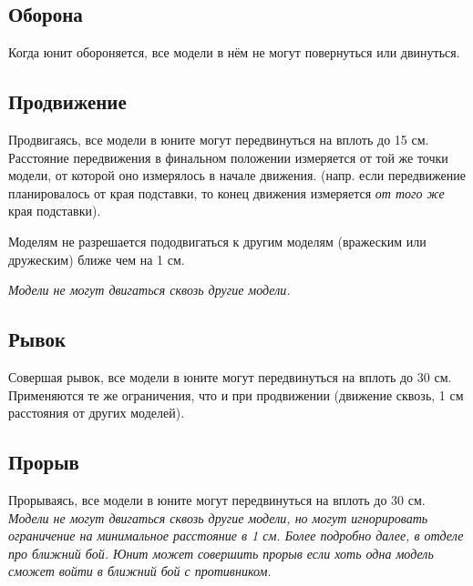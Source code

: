 \documentclass[twocolumn]{article}
\begin{document}
\subsection{Оборона}
Когда юнит обороняется, все модели в нём не могут повернуться или двинуться.

\subsection{Продвижение}
Продвигаясь, все модели в юните могут передвинуться на вплоть до 15 см. Расстояние передвижения в финальном положении измеряется от той же точки модели, от которой оно измерялось в начале движения. (напр. если передвижение планировалось от края подставки, то конец движения измеряется \emph{от того же} края подставки).

Моделям не разрешается пододвигаться к другим моделям (вражеским или дружеским) ближе чем на 1 см.

\emph{Модели не могут двигаться сквозь другие модели.}

\subsection{Рывок}
Совершая рывок, все модели в юните могут передвинуться на вплоть до 30 см. Применяются те же ограничения, что и при продвижении (движение сквозь, 1 см расстояния от других моделей).

\subsection{Прорыв}
Прорываясь, все модели в юните могут передвинуться на вплоть до 30 см. \emph{Модели не могут двигаться сквозь другие модели, но могут игнорировать ограничение на минимальное расстояние в 1 см. Более подробно далее, в отделе про ближний бой. Юнит может совершить прорыв если хоть одна модель сможет войти в ближний бой с противником.}
\end{document}
